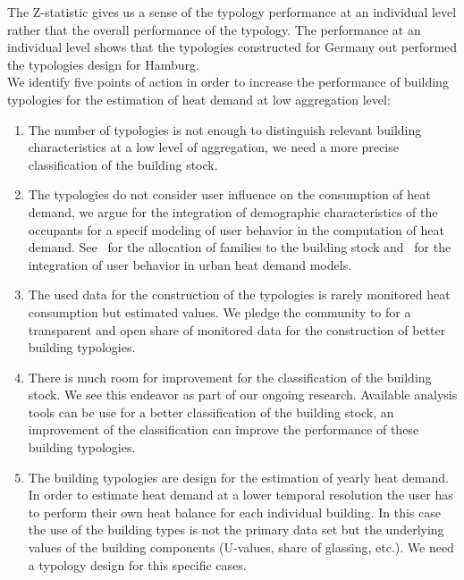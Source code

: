 \documentclass[authoryear,preprint,review,12pt]{elsarticle}
\begin{document}
\begin{linenumbers}
The Z-statistic gives us a sense of the typology performance at an individual
level rather that the overall performance of the typology. The performance at
an individual level shows that the typologies constructed for Germany out
performed the typologies design for Hamburg.\\

We identify five points of action in order to increase the performance of
building typologies for the estimation of heat demand at low aggregation level:

\begin{enumerate}
    \item The number of typologies is not enough to distinguish relevant
        building characteristics at a low level of aggregation, we need a more
        precise classification of the building stock.
    \item The typologies do not consider user influence on the consumption of
        heat demand, we argue for the integration of demographic
        characteristics of the occupants for a specif modeling of user
        behavior in the computation of heat demand.
        See~\cite{Munoz.2014b} for the allocation of families to
        the building stock and~\cite{Munoz.2014c} for the integration of
        user behavior in urban heat demand models.
    \item The used data for the construction of the typologies is rarely
        monitored heat consumption but estimated values. We pledge the
        community to for a transparent and open share of monitored data for the
        construction of better building typologies.
    \item There is much room for improvement for the classification of the
        building stock. We see this endeavor as part of our ongoing research.
        Available analysis tools can be use for a better classification of the
        building stock, an improvement of the classification can improve the
        performance of these building typologies.
    \item The building typologies are design for the estimation of yearly heat
        demand. In order to estimate heat demand at a lower temporal resolution
        the user has to perform their own heat balance for each individual
        building. In this case the use of the building types is not the
        primary data set but the underlying values of the building components
        (U-values, share of glassing, etc.). We need a typology design for this
        specific cases.
\end{enumerate}


\end{linenumbers}
\end{document}

